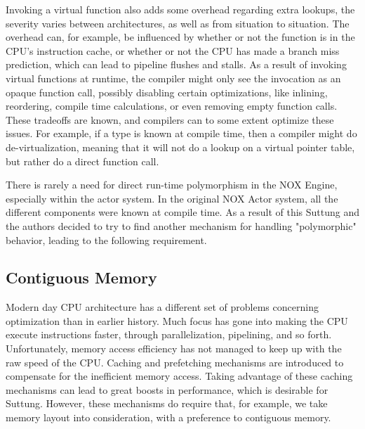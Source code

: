 Invoking a virtual function also adds some overhead regarding extra lookups, the severity varies between architectures,
as well as from situation to situation.
The overhead can, for example, be influenced by whether or not the function is in the CPU's instruction cache, or whether or not the CPU has made a branch miss prediction, which can lead to pipeline flushes and stalls\cite{scott_meyers_cpu_caches_and_why_you_care}\cite[Data Locality]{game_programming_patterns}.
As a result of invoking virtual functions at runtime, the compiler might only see the invocation as an opaque function call,
possibly disabling certain optimizations, like inlining, reordering, compile time calculations, or even removing empty function calls.
These tradeoffs are known, and compilers can to some extent optimize these issues.
For example, if a type is known at compile time, then a compiler might do de-virtualization,
meaning that it will not do a lookup on a virtual pointer table, but rather do a direct function call\cite{lazarenko_devirtualization}.

There is rarely a need for direct run-time polymorphism in the NOX Engine, especially within the actor system.
In the original NOX Actor system, all the different components were known at compile time.
As a result of this Suttung and the authors decided to try to find another mechanism for handling "polymorphic" behavior, leading to the following requirement.


\subsection{Contiguous Memory}
\label{subsec:requirements_performance_contiguous_memory}
Modern day CPU architecture has a different set of problems concerning optimization than in earlier history.
Much focus has gone into making the CPU execute instructions faster, through parallelization, pipelining, and so forth.
Unfortunately, memory access efficiency has not managed to keep up with the raw speed of the CPU.
Caching and prefetching mechanisms are introduced to compensate for the inefficient memory access\cite[p. 153]{game_engine_architecture}.
Taking advantage of these caching mechanisms can lead to great boosts in performance, which is desirable for Suttung.
However, these mechanisms do require that, for example, we take memory layout into consideration, with a preference
to contiguous memory.

